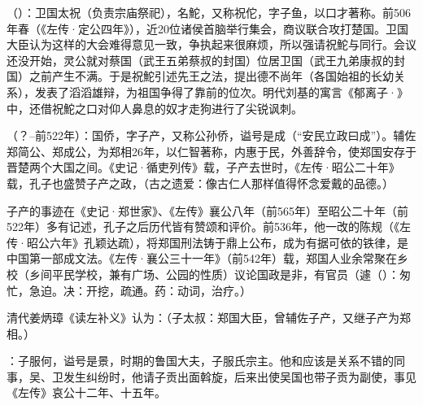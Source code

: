 （）：卫国太祝（负责宗庙祭祀），名鮀，又称祝佗，字子鱼，以口才著称。前506年春（《左传·定公四年》），近20位诸侯首脑举行集会，商议联合攻打楚国。卫国大臣认为这样的大会难得意见一致，争执起来很麻烦，所以强请祝鮀与同行。会议还没开始，灵公就对蔡国（武王五弟蔡叔的封国）位居卫国（武王九弟康叔的封国）之前产生不满。于是祝鮀引述先王之法，提出德不尚年（各国始祖的长幼关系），发表了滔滔雄辩，为祖国争得了靠前的位次。明代刘基的寓言《郁离子·》中，还借祝鮀之口对仰人鼻息的奴才走狗进行了尖锐讽刺。

（？--前522年）：国侨，字子产，又称公孙侨，谥号是成（“安民立政曰成”）。辅佐郑简公、郑成公，为郑相26年，以仁智著称，内惠于民，外善辞令，使郑国安存于晋楚两个大国之间。《史记·循吏列传》载，子产去世时，《左传·昭公二十年》载，孔子也盛赞子产之政，（古之遗爱：像古仁人那样值得怀念爱戴的品德。）

子产的事迹在《史记·郑世家》、《左传》襄公八年（前565年）至昭公二十年（前522年）多有记述，孔子之后历代皆有赞颂和评价。前536年，他一改的陈规（《左传·昭公六年》孔颖达疏），将郑国刑法铸于鼎上公布，成为有据可依的铁律，是中国第一部成文法。《左传·襄公三十一年》（前542年）载，郑国人业余常聚在乡校（乡间平民学校，兼有广场、公园的性质）议论国政是非，有官员（遽（）：匆忙，急迫。决：开挖，疏通。药：动词，治疗。）

清代姜炳璋《读左补义》认为：（子太叔：郑国大臣，曾辅佐子产，又继子产为郑相。）

：子服何，谥号是景，时期的鲁国大夫，子服氏宗主。他和应该是关系不错的同事，吴、卫发生纠纷时，他请子贡出面斡旋，后来出使吴国也带子贡为副使，事见《左传》哀公十二年、十五年。

